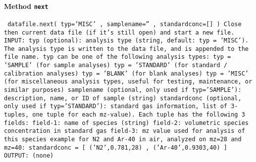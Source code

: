 \paragraph{Method \texttt{next}}
\vspace{1ex}
\texttt{\newline
datafile.next( typ='MISC' , samplename='' , standardconc=[] )\newline
\newline
Close then current data file (if it's still open) and start a new file.\newline
\newline
INPUT:\newline
typ (optional): analysis type (string, default: typ = 'MISC'). The analysis type is written to the data file, and is appended to the file name. typ can be one of the following analysis types:\newline
typ = 'SAMPLE' (for sample analyses)\newline
typ = 'STANDARD' (for standard / calibration analyses)\newline
typ = 'BLANK' (for blank analyses)\newline
typ = 'MISC' (for miscellaneous analysis types, useful for testing, maintenance, or similar purposes)\newline
samplename (optional, only used if typ='SAMPLE'): description, name, or ID of sample (string)\newline
standardconc (optional, only used if typ='STANDARD'): standard gas information, list of 3-tuples, one tuple for each mz-value). Each tuple has the following 3 fields:\newline
field-1: name of species (string)\newline
field-2: volumetric species concentration in standard gas\newline
field-3: mz value used for analysis of this species\newline
\newline
example for N2 and Ar-40 in air, analyzed on mz=28 and mz=40: standardconc = [ ('N2',0.781,28) , ('Ar-40',0.9303,40) ]\newline
\newline
OUTPUT:\newline
(none)\newline
\newline
}

